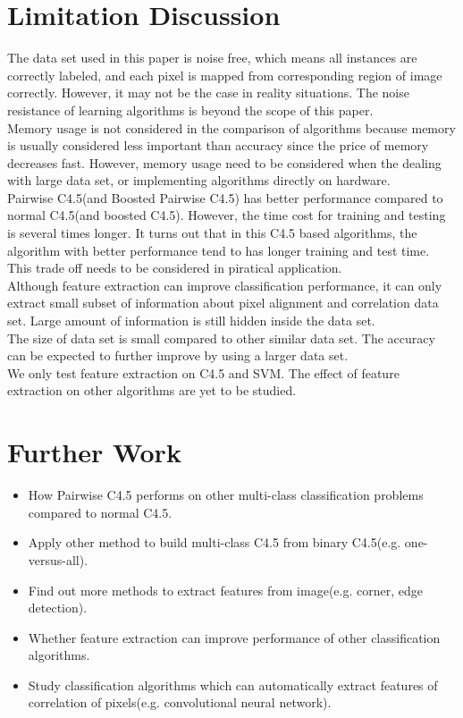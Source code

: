\documentclass[a4paper,11pt]{nurop}
\begin{document}
\section{Limitation Discussion}
The data set used in this paper is noise free, which means all instances are correctly labeled, and each pixel is mapped from corresponding region of image correctly. However, it may not be the case in reality situations. The noise resistance of learning algorithms is beyond the scope of this paper.\\
Memory usage is not considered in the comparison of algorithms because memory is usually considered less important than accuracy since the price of memory decreases fast. However, memory usage need to be considered when the dealing with large data set, or implementing algorithms directly on hardware.\\
Pairwise C4.5(and Boosted Pairwise C4.5) has better performance compared to normal C4.5(and boosted C4.5). However, the time cost for training and testing is several times longer. It turns out that in this C4.5 based algorithms, the algorithm with better performance tend to has longer training and test time. This trade off needs to be considered in piratical application.\\
Although feature extraction can improve classification performance, it can only extract small subset of information about pixel alignment and correlation data set. Large amount of information is still hidden inside the data set.\\
The size of data set is small compared to other similar data set. The accuracy can be expected to further improve by using a larger data set.\\
We only test feature extraction on C4.5 and SVM. The effect of feature extraction on other algorithms are yet to be studied.\\

\section{Further Work}
\begin{itemize}
 \item How Pairwise C4.5 performs on other multi-class classification problems compared to normal C4.5.
 \item Apply other method to build multi-class C4.5 from binary C4.5(e.g. one-versus-all).
 \item Find out more methods to extract features from image(e.g. corner, edge detection).
 \item Whether feature extraction can improve performance of other classification algorithms.
 \item Study classification algorithms which can automatically extract features of correlation of pixels(e.g. convolutional neural network\cite{lecun98}).
\end{itemize}
\end{document}

